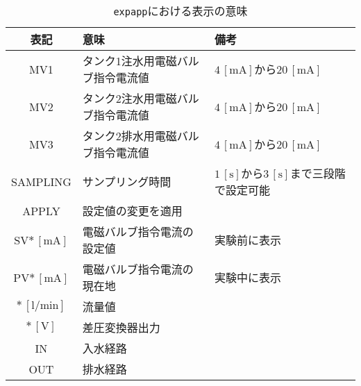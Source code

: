 \begin{table}[b] 
  \begin{center}
    \caption{\texttt{expapp}における表示の意味}
    \begin{tabular}{c|l|l} \hline
      表記                      & 意味                              & 備考 \\ \hline
      MV1                       & タンク1注水用電磁バルブ指令電流値 & $4 \,\mathrm{[mA]}$から$20 \,\mathrm{[mA]}$ \\ \hline
      MV2                       & タンク2注水用電磁バルブ指令電流値 & $4 \,\mathrm{[mA]}$から$20 \,\mathrm{[mA]}$ \\ \hline
      MV3                       & タンク2排水用電磁バルブ指令電流値 & $4 \,\mathrm{[mA]}$から$20 \,\mathrm{[mA]}$ \\ \hline
      SAMPLING                  & サンプリング時間                  & $1 \,\mathrm{[s]}$から$3 \,\mathrm{[s]}$まで三段階で設定可能 \\ \hline
      APPLY                     & 設定値の変更を適用                & \\ \hline
      SV$\ast \,\mathrm{[mA]}$  & 電磁バルブ指令電流の設定値        & 実験前に表示 \\ \hline
      PV$\ast \,\mathrm{[mA]}$  & 電磁バルブ指令電流の現在地        & 実験中に表示 \\ \hline
      $\ast \,\mathrm{[l/min]}$ & 流量値                            & \\ \hline
      $\ast \,\mathrm{[V]}$     & 差圧変換器出力                    & \\ \hline
      IN                        & 入水経路                          & \\ \hline
      OUT                       & 排水経路                          & \\ \hline
    \end{tabular}
    \label{tab:display}
  \end{center}
\end{table}
